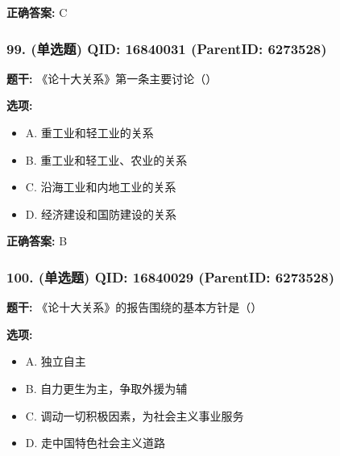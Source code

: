 \documentclass[12pt,UTF8]{ctexart}
\begin{document}
\textbf{正确答案:}
C

\vspace{0.3em}\hrulefill\vspace{0.7em}

\subsubsection*{99. (单选题) \small QID: 16840031 (ParentID: 6273528)}

\textbf{题干:}
《论十大关系》第一条主要讨论（）



\textbf{选项:}
\begin{itemize}[leftmargin=*]

  \item A. 重工业和轻工业的关系

  \item B. 重工业和轻工业、农业的关系

  \item C. 沿海工业和内地工业的关系

  \item D. 经济建设和国防建设的关系

\end{itemize}

\textbf{正确答案:}
B

\vspace{0.3em}\hrulefill\vspace{0.7em}

\subsubsection*{100. (单选题) \small QID: 16840029 (ParentID: 6273528)}

\textbf{题干:}
《论十大关系》的报告围绕的基本方针是（）



\textbf{选项:}
\begin{itemize}[leftmargin=*]

  \item A. 独立自主

  \item B. 自力更生为主，争取外援为辅

  \item C. 调动一切积极因素，为社会主义事业服务

  \item D. 走中国特色社会主义道路

\end{itemize}
\end{document}
